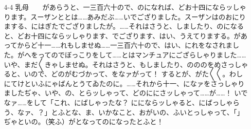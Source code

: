 \documentclass[tate,paper=b6j,jafontsize=9pt]{jlreq}
\begin{document}
\begin{azconvIndented}{4\zw}{-4\zw}
乳母　　があらうと、一三百六十ので、のになれば、どお十四にならッしゃります。スーザンととは……あみだぶ……いでござりました。スーザンはのおにりまする、にはぎたでござりましたが。……それはさうと、しましたり、のになると、どお十四にならッしゃります、でござります、はい、うえてりまする。があってからど十一……れもしませぬ……一三百六十ので、はい、にれをなされました。がへをってのでぼっこりをして……とはマンチュアにござらしゃりました……いや、まだ{〳〵}きゃしませぬ。それはさうと、もしましたり、のののをめさっしゃると、いので、どのがむづかって、をなァがって！ するとが、がた{〳〵}{〳〵}。わしにてけといふにゃばんとうてゐたのに。……それから十一、になァをさっしゃりましたぢゃ、いや、の、とらッしゃって、どのににさッしゃって……が……！ いでなァ……をして「これ、にばしゃったな？ ににならッしゃると、にばっしゃらう、なァ、？」とふとな、ま、いかなこと、おがいの、ふいとっしゃって、「」ぢゃといの。（笑ふ）がとなってのになったとふと！ 
\end{azconvIndented}
\end{document}
